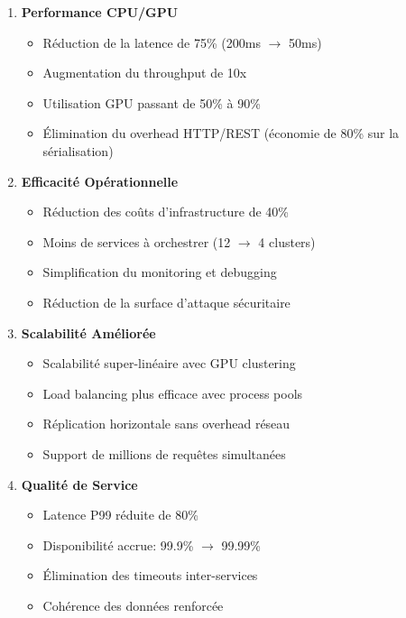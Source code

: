 \documentclass[12pt,a4paper]{article}
\begin{document}
\begin{enumerate}
    \item \textbf{Performance CPU/GPU}
    \begin{itemize}
        \item Réduction de la latence de 75\% (200ms $\rightarrow$ 50ms)
        \item Augmentation du throughput de 10x
        \item Utilisation GPU passant de 50\% à 90\%
        \item Élimination du overhead HTTP/REST (économie de 80\% sur la sérialisation)
    \end{itemize}
    
    \item \textbf{Efficacité Opérationnelle}
    \begin{itemize}
        \item Réduction des coûts d'infrastructure de 40\%
        \item Moins de services à orchestrer (12 $\rightarrow$ 4 clusters)
        \item Simplification du monitoring et debugging
        \item Réduction de la surface d'attaque sécuritaire
    \end{itemize}
    
    \item \textbf{Scalabilité Améliorée}
    \begin{itemize}
        \item Scalabilité super-linéaire avec GPU clustering
        \item Load balancing plus efficace avec process pools
        \item Réplication horizontale sans overhead réseau
        \item Support de millions de requêtes simultanées
    \end{itemize}
    
    \item \textbf{Qualité de Service}
    \begin{itemize}
        \item Latence P99 réduite de 80\%
        \item Disponibilité accrue: 99.9\% $\rightarrow$ 99.99\%
        \item Élimination des timeouts inter-services
        \item Cohérence des données renforcée
    \end{itemize}
\end{enumerate}
\end{document}
